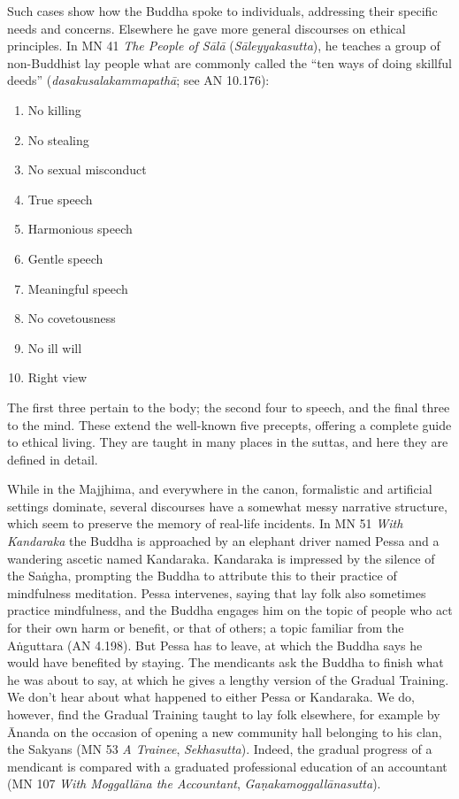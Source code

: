 \documentclass[12pt,openany]{book}%
\begin{document}
Such cases show how the Buddha spoke to individuals, addressing their specific needs and concerns. Elsewhere he gave more general discourses on ethical principles. In MN 41 \textit{The People of \textsanskrit{Sālā}} (\textit{\textsanskrit{Sāleyyakasutta}}), he teaches a group of non-Buddhist lay people what are commonly called the “ten ways of doing skillful deeds” (\textit{\textsanskrit{dasakusalakammapathā}}; see AN 10.176):

\begin{enumerate}%
\item No killing%
\item No stealing%
\item No sexual misconduct%
\item True speech%
\item Harmonious speech%
\item Gentle speech%
\item Meaningful speech%
\item No covetousness%
\item No ill will%
\item Right view%
\end{enumerate}

The first three pertain to the body; the second four to speech, and the final three to the mind. These extend the well-known five precepts, offering a complete guide to ethical living. They are taught in many places in the suttas, and here they are defined in detail.

While in the Majjhima, and everywhere in the canon, formalistic and artificial settings dominate, several discourses have a somewhat messy narrative structure, which seem to preserve the memory of real-life incidents. In MN 51 \textit{With Kandaraka} the Buddha is approached by an elephant driver named Pessa and a wandering ascetic named Kandaraka. Kandaraka is impressed by the silence of the \textsanskrit{Saṅgha}, prompting the Buddha to attribute this to their practice of mindfulness meditation. Pessa intervenes, saying that lay folk also sometimes practice mindfulness, and the Buddha engages him on the topic of people who act for their own harm or benefit, or that of others; a topic familiar from the \textsanskrit{Aṅguttara} (AN 4.198). But Pessa has to leave, at which the Buddha says he would have benefited by staying. The mendicants ask the Buddha to finish what he was about to say, at which he gives a lengthy version of the Gradual Training. We don’t hear about what happened to either Pessa or Kandaraka. We do, however, find the Gradual Training taught to lay folk elsewhere, for example by Ānanda on the occasion of opening a new community hall belonging to his clan, the Sakyans (MN 53 \textit{A Trainee}, \textit{Sekhasutta}). Indeed, the gradual progress of a mendicant is compared with a graduated professional education of an accountant (MN 107 \textit{With \textsanskrit{Moggallāna} the Accountant}, \textit{\textsanskrit{Gaṇakamoggallānasutta}}).
\end{document}
